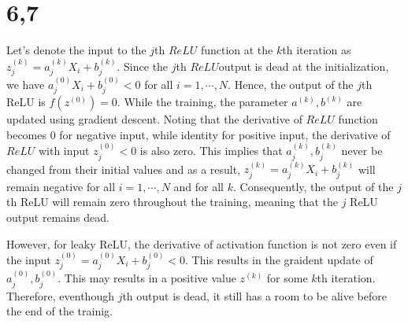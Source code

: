 \documentclass[10pt]{article}
\begin{document}
\section*{6,7}
Let's denote the input to the $j$th $ReLU$ function at the $k$th iteration as $z^{(k)}_j = a^{(k)}_jX_i + b^{(k)}_j$. Since the $j$th $ReLU$output is dead at the initialization, we have $a^{(0)}_jX_i + b^{(0)}_j<0$ for all $i=1,\cdots,N$. Hence, the output of the $j$th ReLU is $f(z^{(0)}) = 0$.
While the training, the parameter $a^{(k)}, b^{(k)}$ are updated using gradient descent. Noting that the derivative of $ReLU$ function becomes 0 for negative input, while identity for positive input, the derivative of $ReLU$ with input $z^{(0)}_j<0$ is also zero. 
This implies that $a^{(k)}_j,b^{(k)}_j$ never be changed from their initial values and as a result, $z^{(k)}_j = a^{(k)}_jX_i + b^{(k)}_j$ will remain negative for all $i = 1,\cdots,N$ and for all $k$. 
Consequently, the output of the $j$th ReLU will remain zero throughout the training, meaning that the $j$ ReLU output remains dead.

However, for leaky ReLU, the derivative of activation function is not zero even if the input $z^{(0)}_j = a^{(0)}_jX_i + b^{(0)}_j <0$. This results in the graident update of $a^{(0)}_j,b^{(0)}_j$. This may results in a positive value $z^{(k)}$ for some $k$th iteration.
Therefore, eventhough $j$th output is dead, it still has a room to be alive before the end of the trainig. 

\appendix
\end{document}
